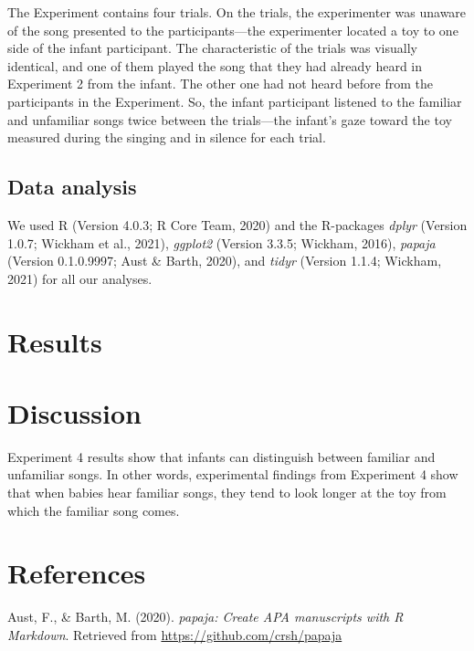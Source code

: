 \documentclass[
  english,
  man]{apa6}
\begin{document}
The Experiment contains four trials. On the trials, the experimenter was unaware of the song presented to the participants---the experimenter located a toy to one side of the infant participant. The characteristic of the trials was visually identical, and one of them played the song that they had already heard in Experiment 2 from the infant. The other one had not heard before from the participants in the Experiment. So, the infant participant listened to the familiar and unfamiliar songs twice between the trials---the infant's gaze toward the toy measured during the singing and in silence for each trial.

\hypertarget{data-analysis}{%
\subsection{Data analysis}\label{data-analysis}}

We used R (Version 4.0.3; R Core Team, 2020) and the R-packages \emph{dplyr} (Version 1.0.7; Wickham et al., 2021), \emph{ggplot2} (Version 3.3.5; Wickham, 2016), \emph{papaja} (Version 0.1.0.9997; Aust \& Barth, 2020), and \emph{tidyr} (Version 1.1.4; Wickham, 2021) for all our analyses.

\hypertarget{results}{%
\section{Results}\label{results}}

\hypertarget{discussion}{%
\section{Discussion}\label{discussion}}

Experiment 4 results show that infants can distinguish between familiar and unfamiliar songs. In other words, experimental findings from Experiment 4 show that when babies hear familiar songs, they tend to look longer at the toy from which the familiar song comes.

\newpage

\hypertarget{references}{%
\section{References}\label{references}}

\begingroup
\setlength{\parindent}{-0.5in}
\setlength{\leftskip}{0.5in}

\hypertarget{refs}{}
\leavevmode\hypertarget{ref-R-papaja}{}%
Aust, F., \& Barth, M. (2020). \emph{papaja: Create APA manuscripts with R Markdown}. Retrieved from \url{https://github.com/crsh/papaja}
\end{document}
